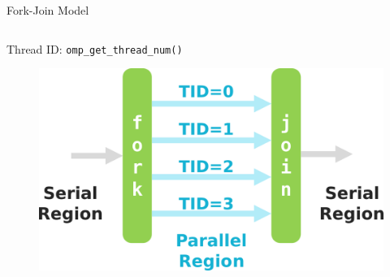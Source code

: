 \begin{frame}[fragile]{Fork-Join Model}
  \begin{columns}[T] %
    \begin{column}{1\textwidth}
      Thread ID: \verb|omp_get_thread_num()|
      \vspace{-5pt}
      \begin{figure}
        \centering
        \includegraphics[width=0.7\linewidth]{day8_am/img/fork-join-mine.png}
      \end{figure}
    \end{column}
  \end{columns}
\end{frame}

